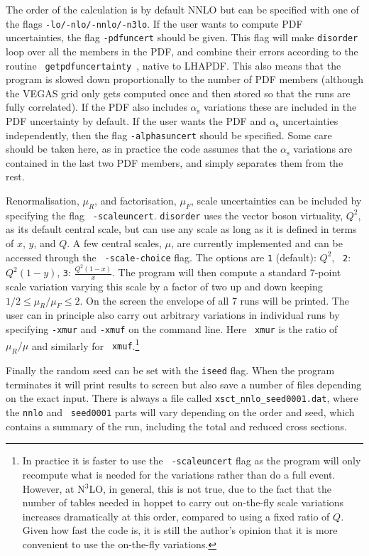 \documentclass[submission, PhysCodeb]{SciPost}
\newcommand{\hoppet}{{\sc hoppet}}
\newcommand{\disorder}{{\tt disorder}}
\newcommand{\as}{\alpha_{\mathrm{s}}}
\newcommand{\NNNLO}{N$^3$LO}
\begin{document}
The order of the calculation is by default NNLO but can be specified
with one of the flags {\tt -lo/-nlo/-nnlo/-n3lo}. If the user wants to
compute PDF uncertainties, the flag {\tt -pdfuncert} should be
given. This flag will make \disorder{} loop over all the members in
the PDF, and combine their errors according to the routine {\tt
  getpdfuncertainty}~\cite{Watt:2011kp}, native to LHAPDF. This also
means that the program is slowed down proportionally to the number of
PDF members (although the VEGAS grid only gets computed once and then
stored so that the runs are fully correlated). If the PDF also
includes $\as$ variations these are included in the PDF uncertainty by
default. If the user wants the PDF and $\as$ uncertainties
independently, then the flag {\tt -alphasuncert} should be
specified. Some care should be taken here, as in practice the code
assumes that the $\as$ variations are contained in the last two PDF
members, and simply separates them from the rest.

Renormalisation, $\mu_R$, and factorisation, $\mu_F$, scale
uncertainties can be included by specifying the flag {\tt
  -scaleuncert}. \disorder{} uses the vector boson virtuality, $Q^2$,
as its default central scale, but can use any scale as long as it is
defined in terms of $x$, $y$, and $Q$. A few central scales, $\mu$,
are currently implemented and can be accessed through the {\tt
  -scale-choice} flag. The options are {\tt 1} (default): $Q^2$, {\tt
  2}: $Q^2(1-y)$, {\tt 3}: $\frac{Q^2(1-x)}{x}$. The program will then
compute a standard 7-point scale variation varying this scale by a
factor of two up and down keeping $1/2\le \mu_R/\mu_F\le 2$. On the
screen the envelope of all 7 runs will be printed. The user can in
principle also carry out arbitrary variations in individual runs by
specifying {\tt -xmur} and {\tt -xmuf} on the command line. Here {\tt
  xmur} is the ratio of $\mu_R/\mu$ and similarly for {\tt
  xmuf}.\footnote{In practice it is faster to use the {\tt
  -scaleuncert} flag as the program will only recompute what is needed
for the variations rather than do a full event. However, at \NNNLO{},
in general, this is not true, due to the fact that the number of
tables needed in \hoppet{} to carry out on-the-fly scale variations
increases dramatically at this order, compared to using a fixed ratio
of $Q$. Given how fast the code is, it is still the author's opinion
that it is more convenient to use the on-the-fly variations.}

Finally the random seed can be set with the {\tt iseed} flag. When the
program terminates it will print results to screen but also save a
number of files depending on the exact input. There is always a file
called {\tt xsct\_nnlo\_seed0001.dat}, where the {\tt nnlo} and {\tt
  seed0001} parts will vary depending on the order and seed, which
contains a summary of the run, including the total and reduced cross
sections. 
\end{document}
